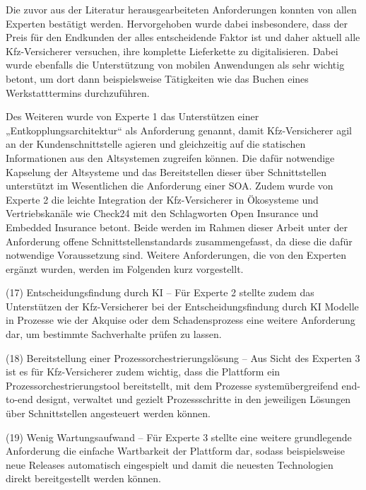 

Die zuvor aus der Literatur herausgearbeiteten Anforderungen konnten von allen Experten bestätigt werden. Hervorgehoben wurde dabei insbesondere, dass der Preis für den Endkunden der alles entscheidende Faktor ist und daher aktuell alle Kfz-Versicherer versuchen, ihre komplette Lieferkette zu digitalisieren. Dabei wurde ebenfalls die Unterstützung von mobilen Anwendungen als sehr wichtig betont, um dort dann beispielsweise Tätigkeiten wie das Buchen eines Werkstatttermins durchzuführen. 

Des Weiteren wurde von Experte 1 das Unterstützen einer „Entkopplungsarchitektur“ als Anforderung genannt, damit Kfz-Versicherer agil an der Kundenschnittstelle agieren und gleichzeitig auf die statischen Informationen aus den Altsystemen zugreifen können.\autocite[Vgl.][]{LEMONIDIS2023} Die dafür notwendige Kapselung der Altsysteme und das Bereitstellen dieser über Schnittstellen unterstützt im Wesentlichen die Anforderung einer SOA. Zudem wurde von Experte 2 die leichte Integration der Kfz-Versicherer in Ökosysteme und Vertriebskanäle wie Check24 mit den Schlagworten Open Insurance und Embedded Insurance betont.\autocite[Vgl.][]{GREBERT2023} Beide werden im Rahmen dieser Arbeit unter der Anforderung offene Schnittstellenstandards zusammengefasst, da diese die dafür notwendige Voraussetzung sind. Weitere Anforderungen, die von den Experten ergänzt wurden, werden im Folgenden kurz vorgestellt.

(17) Entscheidungsfindung durch KI – Für Experte 2 stellte zudem das Unterstützen der Kfz-Versicherer bei der Entscheidungsfindung durch KI Modelle in Prozesse wie der Akquise oder dem Schadensprozess eine weitere Anforderung dar, um bestimmte Sachverhalte prüfen zu lassen.\autocite[Vgl.][]{GREBERT2023} 

(18) Bereitstellung einer Prozessorchestrierungslösung – Aus Sicht des Experten 3 ist es für Kfz-Versicherer zudem wichtig, dass die Plattform ein Prozessorchestrierungstool bereitstellt, mit dem Prozesse systemübergreifend end-to-end designt, verwaltet und gezielt Prozessschritte in den jeweiligen Lösungen über Schnittstellen angesteuert werden können. \autocite[Vgl.][]{SCHMIDT2023} 

(19) Wenig Wartungsaufwand – Für Experte 3 stellte eine weitere grundlegende Anforderung die einfache Wartbarkeit der Plattform dar, sodass beispielsweise neue Releases automatisch eingespielt und damit die neuesten Technologien direkt bereitgestellt werden können. \autocite[Vgl.][]{SCHMIDT2023} 

